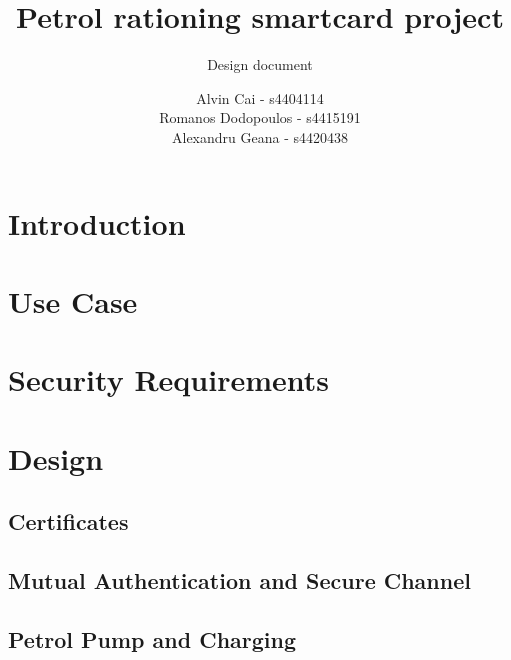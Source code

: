 \documentclass[a4paper,10pt]{llncs}
\title{Petrol rationing smartcard project}
\subtitle{Design document}
\author{Alvin Cai - s4404114 \\ Romanos Dodopoulos - s4415191 \\ Alexandru Geana - s4420438}
\institute{}
\begin{document}
\maketitle

\section{Introduction}


\section{Use Case}



\section{Security Requirements}



\section{Design}
\subsection{Certificates}

\subsection{Mutual Authentication and Secure Channel}

\subsection{Petrol Pump and Charging}
\end{document}
